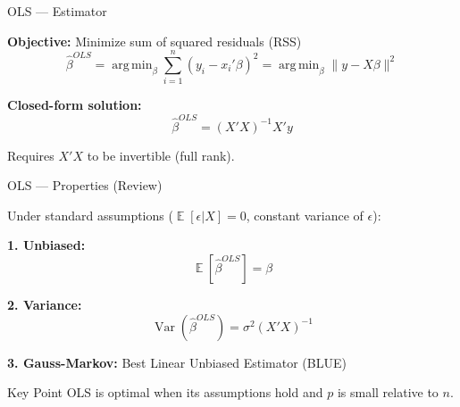 \documentclass[10pt]{beamer}
\DeclareMathOperator*{\argmin}{arg\,min}
\DeclareMathOperator{\E}{\mathbb{E}}
\DeclareMathOperator{\Var}{Var}
\begin{document}

\begin{frame}{OLS --- Estimator}

\textbf{Objective:} Minimize sum of squared residuals (RSS)
\[
\widehat{\beta}^{OLS} = \argmin_\beta \sum_{i=1}^n (y_i - x_i'\beta)^2 = \argmin_\beta \|y - X\beta\|^2
\]

\vspace{1em}
\textbf{Closed-form solution:}
\[
\widehat{\beta}^{OLS} = (X'X)^{-1}X'y
\]

\vspace{0.5em}
Requires $X'X$ to be invertible (full rank).

\end{frame}


\begin{frame}{OLS --- Properties (Review)}

Under standard assumptions ($\E[\epsilon|X] = 0$, constant variance of $\epsilon$):

\vspace{1em}
\textbf{1. Unbiased:}
\[
\E[\widehat{\beta}^{OLS}] = \beta
\]

\vspace{0.5em}
\textbf{2. Variance:}
\[
\Var(\widehat{\beta}^{OLS}) = \sigma^2 (X'X)^{-1}
\]

\vspace{0.5em}
\textbf{3. Gauss-Markov:} Best Linear Unbiased Estimator (BLUE)

\vspace{1em}
\begin{block}{Key Point}
OLS is optimal when its assumptions hold and $p$ is small relative to $n$.
\end{block}

\end{frame}

\end{document}
